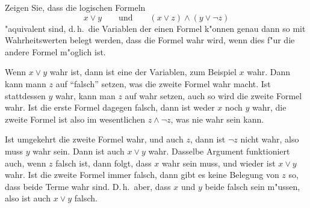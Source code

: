 Zeigen Sie, dass die logischen Formeln
\[
x\vee y\qquad\text{und}\qquad (x\vee z)\wedge (y\vee \neg z)
\]
"aquivalent sind, d.\,h.~die Variablen der einen Formel k"onnen
genau dann so mit Wahrheitswerten
belegt werden, dass die Formel wahr wird, wenn dies f"ur die andere Formel
m"oglich ist.

\begin{loesung}
Wenn $x\vee y$ wahr ist, dann ist eine der Variablen, zum Beispiel
$x$ wahr.
Dann kann mann $z$ auf ``falsch'' setzen, was die zweite Formel wahr macht.
Ist stattdessen $y$ wahr, kann man $z$ auf wahr setzen, auch so wird die
zweite Formel wahr.
Ist die erste Formel dagegen falsch, dann ist weder $x$ noch $y$ wahr,
die zweite Formel ist also im wesentlichen $z\wedge \neg z$, was nie
wahr sein kann.

Ist umgekehrt die zweite Formel wahr, und auch $z$, dann ist $\neg z$ nicht 
wahr, also muss $y$ wahr sein. Dann ist auch $x\vee y$ wahr. Dasselbe
Argument funktioniert auch, wenn $z$ falsch ist, dann folgt, dass $x$
wahr sein muss, und wieder ist $x\vee y$ wahr.
Ist die zweite Formel immer falsch, dann gibt es keine Belegung von
$z$ so, dass beide Terme wahr sind. D.\,h.~aber, dass $x$ und $y$
beide falsch sein m"ussen, also ist auch $x\vee y$ falsch.
\end{loesung}
